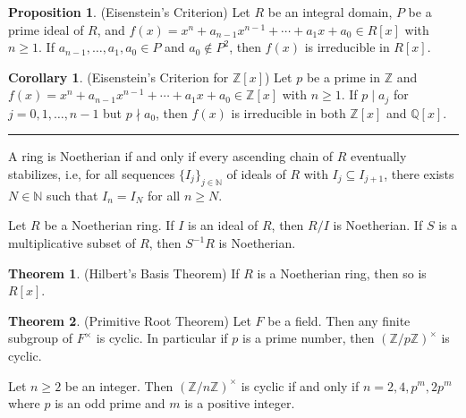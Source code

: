 \documentclass[12pt]{article}
\newcommand{\sepline}{\rule{\textwidth}{0.4pt}}
\theoremstyle{definition}
\newtheorem{theorem}{Theorem}
\newtheorem{corollary}{Corollary}
\newtheorem{proposition}{Proposition}
\newcommand{\N}{\mathbb{N}}
\newcommand{\Z}{\mathbb{Z}}
\newcommand{\Q}{\mathbb{Q}}
\newcommand{\<}{\left\langle}
\renewcommand{\>}{\right\rangle}
\newcommand{\divides}{\mid}
\newcommand{\ndivides}{\nmid}
\begin{document}
\begin{proposition}(Eisenstein's Criterion)
    Let $R$ be an integral domain, $P$ be a prime ideal of $R$, and $f(x) = x^n + a_{n-1}x^{n-1} + \cdots + a_1 x + a_0 \in R[x]$ with $n \geq 1$. If $a_{n-1}, \dots, a_1, a_0 \in P$ and $a_0 \notin P^2$, then $f(x)$ is irreducible in $R[x]$.
\end{proposition}

\begin{corollary}(Eisenstein's Criterion for $\Z[x]$)
    Let $p$ be a prime in $\Z$ and $f(x) = x^n + a_{n-1}x^{n-1} + \cdots + a_1 x + a_0 \in \Z[x]$ with $n \geq 1$. If $p \divides a_j$ for $j = 0, 1, \dots, n-1$ but $p \ndivides a_0$, then $f(x)$ is irreducible in both $\Z[x]$ and $\Q[x]$.
\end{corollary}

\sepline

A ring is Noetherian if and only if every ascending chain of $R$ eventually stabilizes, i.e, for all sequences $\{I_j\}_{j\in\N}$ of ideals of $R$ with $I_j \subseteq I_{j+1}$, there exists $N \in \N$ such that $I_n = I_N$ for all $n \geq N$.

Let $R$ be a Noetherian ring. If $I$ is an ideal of $R$, then $R/I$ is Noetherian. If $S$ is a multiplicative subset of $R$, then $S^{-1}R$ is Noetherian.

\begin{theorem}(Hilbert's Basis Theorem)
    If $R$ is a Noetherian ring, then so is $R[x]$.
\end{theorem}

\begin{theorem}(Primitive Root Theorem)
    Let $F$ be a field. Then any finite subgroup of $F^\times$ is cyclic. In particular if $p$ is a prime number, then $(\Z/p\Z)^\times$ is cyclic.
\end{theorem}

Let $n \geq 2$ be an integer. Then $(\Z/n\Z)^\times$ is cyclic if and only if $n = 2, 4, p^m, 2p^m$ where $p$ is an odd prime and $m$ is a positive integer.
\end{document}
